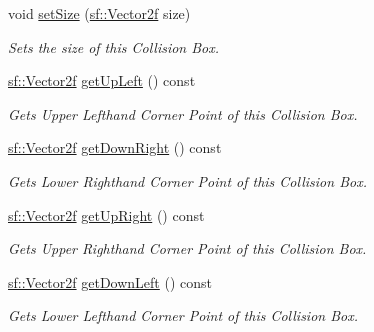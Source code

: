 \begin{DoxyCompactItemize}
void \mbox{\hyperlink{class_collision_box_a69648de73a107cdac3b46d6aa0c833b0}{set\+Size}} (\mbox{\hyperlink{classsf_1_1_vector2}{sf\+::\+Vector2f}} size)
\begin{DoxyCompactList}\small\item\em Sets the size of this Collision Box. \end{DoxyCompactList}\item 
\mbox{\label{class_collision_box_a4106d52af11e472171568cf375e01a51}} 
\mbox{\hyperlink{classsf_1_1_vector2}{sf\+::\+Vector2f}} \mbox{\hyperlink{class_collision_box_a4106d52af11e472171568cf375e01a51}{get\+Up\+Left}} () const
\begin{DoxyCompactList}\small\item\em Gets Upper Lefthand Corner Point of this Collision Box. \end{DoxyCompactList}\item 
\mbox{\label{class_collision_box_a0ca5f6e250b78f9420e91e41afccc791}} 
\mbox{\hyperlink{classsf_1_1_vector2}{sf\+::\+Vector2f}} \mbox{\hyperlink{class_collision_box_a0ca5f6e250b78f9420e91e41afccc791}{get\+Down\+Right}} () const
\begin{DoxyCompactList}\small\item\em Gets Lower Righthand Corner Point of this Collision Box. \end{DoxyCompactList}\item 
\mbox{\label{class_collision_box_afeea4355f3c6303a9c7f38b4216fc400}} 
\mbox{\hyperlink{classsf_1_1_vector2}{sf\+::\+Vector2f}} \mbox{\hyperlink{class_collision_box_afeea4355f3c6303a9c7f38b4216fc400}{get\+Up\+Right}} () const
\begin{DoxyCompactList}\small\item\em Gets Upper Righthand Corner Point of this Collision Box. \end{DoxyCompactList}\item 
\mbox{\label{class_collision_box_acdcbce66fd3f2bf6271856b7324f4fff}} 
\mbox{\hyperlink{classsf_1_1_vector2}{sf\+::\+Vector2f}} \mbox{\hyperlink{class_collision_box_acdcbce66fd3f2bf6271856b7324f4fff}{get\+Down\+Left}} () const
\begin{DoxyCompactList}\small\item\em Gets Lower Lefthand Corner Point of this Collision Box. \end{DoxyCompactList}\item 

\end{DoxyCompactItemize}
